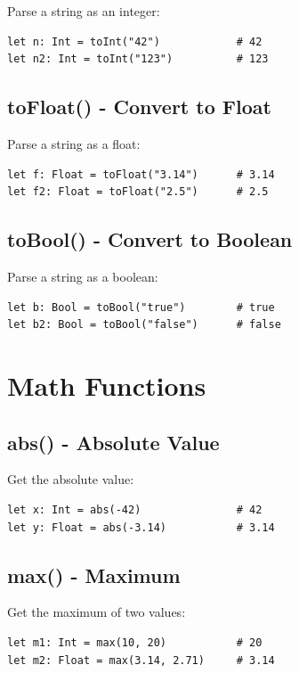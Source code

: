 \documentclass[11pt,twoside,openright]{book}
\begin{document}
Parse a string as an integer:

\begin{lstlisting}[language=ConstructLang]
let n: Int = toInt("42")            # 42
let n2: Int = toInt("123")          # 123
\end{lstlisting}

\subsection{toFloat() - Convert to Float}

Parse a string as a float:

\begin{lstlisting}[language=ConstructLang]
let f: Float = toFloat("3.14")      # 3.14
let f2: Float = toFloat("2.5")      # 2.5
\end{lstlisting}

\subsection{toBool() - Convert to Boolean}

Parse a string as a boolean:

\begin{lstlisting}[language=ConstructLang]
let b: Bool = toBool("true")        # true
let b2: Bool = toBool("false")      # false
\end{lstlisting}

\section{Math Functions}

\subsection{abs() - Absolute Value}

Get the absolute value:

\begin{lstlisting}[language=ConstructLang]
let x: Int = abs(-42)               # 42
let y: Float = abs(-3.14)           # 3.14
\end{lstlisting}

\subsection{max() - Maximum}

Get the maximum of two values:

\begin{lstlisting}[language=ConstructLang]
let m1: Int = max(10, 20)           # 20
let m2: Float = max(3.14, 2.71)     # 3.14
\end{lstlisting}
\end{document}
